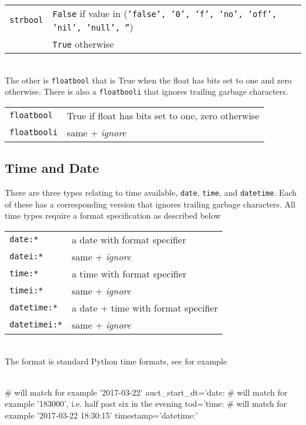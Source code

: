 \begin{tabular}{ll}
  \texttt{strbool} & \texttt{False} if value in (\texttt{'false', '0', 'f', 'no', 'off', 'nil', 'null', ''})\\
                   & \texttt{True} otherwise
\end{tabular}
\\
The other is \texttt{floatbool} that is True when the float has bits
set to one and zero otherwise.  There is also a \texttt{floatbooli}
that ignores trailing garbage characters.\\

\begin{tabular}{ll}
  \texttt{floatbool}  & True if float has bits set to one, zero otherwise\\
  \texttt{floatbooli} & same + \emph{ignore}\\
\end{tabular}



\subsection{Time and Date}
There are three types relating to time available, \texttt{date},
\texttt{time}, and \texttt{datetime}.  Each of these has a
corresponding version that ignores trailing garbage characters.
All time types require a format specification as described below\\

\begin{tabular}{ll}
  \texttt{date:*}      & a date with format specifier\\
  \texttt{datei:*}     & same + \emph{ignore}\\
  \texttt{time:*}      & a time with format specifier\\
  \texttt{timei:*}     & same + \emph{ignore}\\
  \texttt{datetime:*}  & a date + time with format specifier\\
  \texttt{datetimei:*} & same + \emph{ignore}\\
\end{tabular}\\

The format is standard Python time formats, see for example\\
\\
\begin{python}
   # will match for example '2017-03-22'
   auct_start_dt='date:%
   # will match for example '183000', i.e. half past six in the evening
   tod='time:%
   # will match for example '2017-03-22 18:30:15'
   timestamp='datetime:'%
\end{python}


